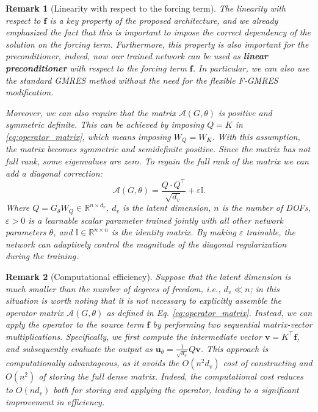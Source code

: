 \documentclass{article}
\newcommand{\Dlat}{d_v} %
\theoremstyle{plain}
\newtheorem{rmk}{Remark}
\numberwithin{equation}{section}
\begin{document}
\begin{rmk}[Linearity with respect to the forcing term]\label{rmk:linearity_forcing_term}
    The linearity with respect to $\mathbf{f}$ is a key property of the proposed architecture, and we already emphasized the fact that this is important to impose the correct dependency of the solution on the forcing term. Furthermore, this property is also important for the preconditioner, indeed, now our trained network can be used as \textbf{linear preconditioner} with respect to the forcing term $\mathbf{f}$. In particular, we can also use the standard GMRES method without the need for the flexible F-GMRES modification.

    Moreover, we can also require that the matrix $\mathcal{A}(G, \theta)$ is positive and symmetric definite. This can be achieved by imposing $Q=K$ in \eqref{eq:operator_matrix}, which means imposing $W_Q=W_K$. With this assumption, the matrix becomes symmetric and semidefinite positive. Since the matrix has not full rank, some eigenvalues are zero. To regain the full rank of the matrix we can add a diagonal correction:
    \begin{equation}
        \mathcal{A}(G, \theta) =  \frac{Q \cdot Q^\top}{\sqrt{\Dlat}} + \varepsilon \mathbb{I}.
        \label{eq:spd_preconditioner}
    \end{equation}
    Where  $Q = G_\theta W_Q \in \mathbb{R}^{n\times \Dlat}$, $\Dlat$ is the latent dimension, $n$ is the number of DOFs, $\varepsilon > 0$ is a learnable scalar parameter trained jointly with all other network parameters $\theta$, and $\mathbb{I} \in \mathbb{R}^{n\times n}$ is the identity matrix. By making $\varepsilon$ trainable, the network can adaptively control the magnitude of the diagonal regularization during the training.
\end{rmk}

\begin{rmk}[Computational efficiency]
    Suppose that the latent dimension is much smaller than the number of degrees of freedom, i.e., $\Dlat \ll n$; in this situation is worth noting that it is not necessary to explicitly assemble the operator matrix $\mathcal{A}(G, \theta)$ as defined in Eq. \eqref{eq:operator_matrix}. Instead, we can apply the operator to the source term $\mathbf{f}$ by performing two sequential matrix-vector multiplications. Specifically, we first compute the intermediate vector $\mathbf{v} = K^\top \mathbf{f}$, and subsequently evaluate the output as $\mathbf{u}_\theta = \frac{1}{\sqrt{\Dlat}} Q \mathbf{v}$. This approach is computationally advantageous, as it avoids the $O(n^2\Dlat)$ cost of constructing and $O(n^2)$ of storing the full dense matrix. Indeed, the computational cost reduces to $O(n\Dlat)$ both for storing and applying the operator, leading to a significant improvement in efficiency.
\end{rmk}
\end{document}
